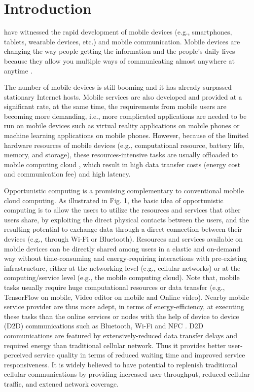 \documentclass[journal]{IEEEtran}
\begin{document}
\IEEEpeerreviewmaketitle

\section{Introduction}

 have witnessed the rapid development of mobile devices (e.g., smartphones, tablets, wearable devices, etc.) and mobile communication. Mobile devices are changing the way people getting the information and the people’s daily lives because they allow you multiple ways of communicating almost anywhere at anytime \cite{satyanarayanan2010mobile}.

The number of mobile devices is still booming and it has already surpassed stationary Internet hosts.
Mobile services are also developed and provided at a significant rate, at the same time, the requirements from mobile users are becoming more demanding, i.e., more complicated applications are needed to be run on mobile devices such as virtual reality applications on mobile phones \cite{bastug2017toward} or machine learning applications \cite{abadi2016TensorFlow} on mobile phones. However, because of the limited hardware resources of mobile devices (e.g., computational resource, battery life, memory, and storage), these resources-intensive tasks are usually offloaded to mobile computing cloud \cite{dinh2013survey}, which result in high data transfer costs (energy cost and communication fee) and high latency.

Opportunistic computing is a promising complementary to conventional mobile cloud computing. As illustrated in Fig. 1, the basic idea of opportunistic computing is to allow the users to utilize the resources and services that other users share, by exploiting the direct physical contacts between the users, and the resulting potential to exchange data through a direct connection between their devices (e.g., through Wi-Fi or Bluetooth). Resources and services available on mobile devices can be directly shared among users in a elastic and on-demand way without time-consuming and energy-requiring interactions with pre-existing infrastructure, either at the networking level (e.g., cellular networks) or at the computing/service level (e.g., the mobile computing cloud). 
Note that, mobile tasks usually require huge computational resources or data transfer (e.g., TensorFlow on mobile, Video editor on mobile and Online video). Nearby mobile service provider are thus more adept, in terms of energy-efficiency, at executing these tasks than the online services or nodes with the help of device to device (D2D) communications such as Bluetooth, Wi-Fi and NFC \cite{balani2007energy}. D2D communications are featured by extensively-reduced data transfer delays and required energy than traditional cellular network. Thus it provides better user-perceived service quality in terms of reduced waiting time and improved service responsiveness. It is widely believed to have potential to replenish traditional cellular communications by providing increased user throughput, reduced cellular traffic, and extened network coverage.
\end{document}
